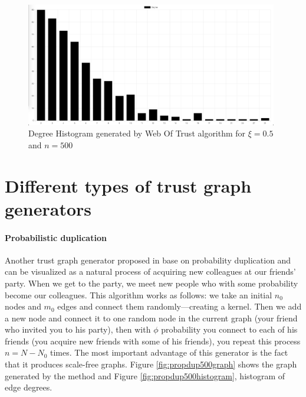 \begin{figure}[h!]
    \includegraphics[width=11cm]{img/webOfTrust500Hist.png}
    \centering
    \caption{Degree Histogram generated by Web Of Trust algorithm for $\xi=0.5$ and $n = 500$}
    \label{fig:trustgraph500histogram}
\end{figure} 

\section{Different types of trust graph generators}

\paragraph{Probabilistic duplication}
Another trust graph generator proposed in \cite{konorski2019mitigating} base on probability duplication and can be visualized as a natural process of acquiring new colleagues at our friends' party. When we get to the party, we meet new people who with some probability become our colleagues. This algorithm works as follows: we take an initial $n_0$ nodes and $m_0$ edges and connect them randomly---creating a kernel. Then we add a new node and connect it to one random node in the current graph (your friend who invited you to his party), then with $\phi$ probability you connect to each of his friends (you acquire new friends with some of his friends), you repeat this process $n = N - N_0$ times. 
The most important advantage of this generator is the fact that it produces scale-free graphs. Figure \ref{fig:propdup500graph} shows the graph generated by the method and Figure \ref{fig:propdup500histogram}, histogram of edge degrees.

